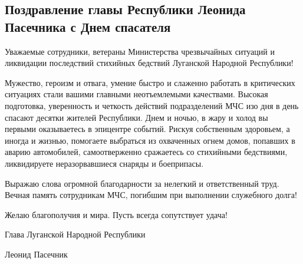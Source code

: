  
 
 
 
 
\subsection{Поздравление главы Республики Леонида Пасечника с Днем спасателя}
\label{sec:27_12_2021.stz.news.lnr.lug_info.1.den_spasatelja}


Уважаемые сотрудники, ветераны Министерства чрезвычайных ситуаций и ликвидации
последствий стихийных бедствий Луганской Народной Республики!


Мужество, героизм и отвага, умение быстро и слаженно работать в критических
ситуациях стали вашими главными неотъемлемыми качествами. Высокая подготовка,
уверенность и четкость действий подразделений МЧС изо дня в день спасают
десятки жителей Республики. Днем и ночью, в жару и холод вы первыми
оказываетесь в эпицентре событий. Рискуя собственным здоровьем, а иногда и
жизнью, помогаете выбраться из охваченных огнем домов, попавших в аварию
автомобилей, самоотверженно сражаетесь со стихийными бедствиями, ликвидируете
неразорвавшиеся снаряды и боеприпасы.

Выражаю слова огромной благодарности за нелегкий и ответственный труд. Вечная
память сотрудникам МЧС, погибшим при выполнении служебного долга!

Желаю благополучия и мира. Пусть всегда сопутствует удача!

Глава Луганской Народной Республики

Леонид Пасечник
